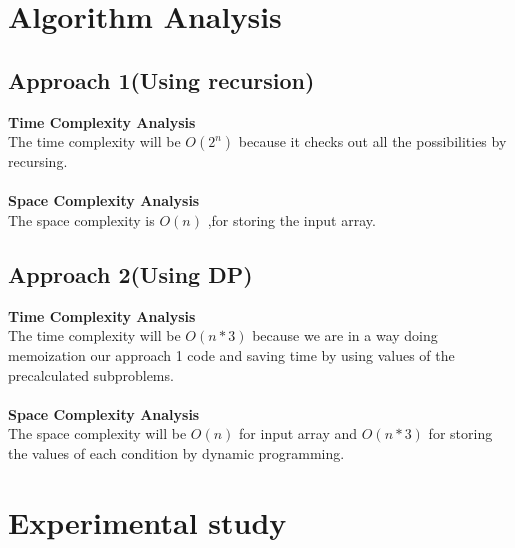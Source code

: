\documentclass[conference]{IEEEtran}
\begin{document}
\newpage

\section{Algorithm Analysis}

\subsection{\textbf{Approach 1(Using recursion)}} 
\textbf{Time Complexity Analysis}\\
The time complexity will be $\displaystyle{O}{\left({2}^{n}\right)}$ because it checks out all the possibilities by recursing.\\ \\
\textbf{Space Complexity Analysis}\\
The space complexity is $\displaystyle{O}{\left({n}\right)}$ ,for storing the input array.

\subsection{\textbf{Approach 2(Using DP)}} 
\textbf{Time Complexity Analysis}\\
The time complexity will be $\displaystyle{O}{\left({n}*{3}\right)}$ because we are in a way doing memoization our approach 1 code and saving time by using values of the precalculated subproblems.\\ \\
\textbf{Space Complexity Analysis}\\
The space complexity will  be $\displaystyle{O}{\left({n}\right)}$ for input array and $\displaystyle{O}{\left({n}*{3}\right)}$ for storing the values of each condition by dynamic programming.

\clearpage
\section{Experimental study}

\end{document}
